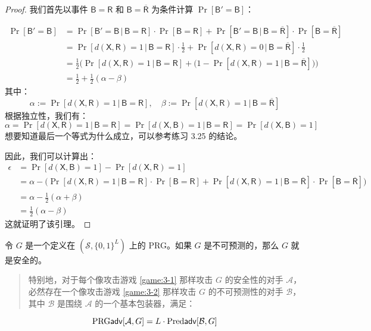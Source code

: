 \begin{proof}
我们首先以事件 $\mathsf{B}=\mathsf{R}$ 和 $\mathsf{B}=\mathsf{\overline R}$ 为条件计算 $\Pr[\mathsf{B}'=\mathsf{B}]$：

$$
\begin{aligned}
\Pr[\mathsf{B}'=\mathsf{B}]
&=\Pr[\mathsf{B}'=\mathsf{B}\,|\,\mathsf{B}=\mathsf{R}]\cdot\Pr[\mathsf{B}=\mathsf{R}]+\Pr[\mathsf{B}'=\mathsf{B}\,|\,\mathsf{B}=\mathsf{\overline R}]\cdot\Pr[\mathsf{B}=\mathsf{\overline R}]\\
&=\Pr[d(\mathsf{X},\mathsf{R})=1\,|\,\mathsf{B}=\mathsf{R}]\cdot\frac{1}{2}+\Pr[d(\mathsf{X},\mathsf{R})=0\,|\,\mathsf{B}=\mathsf{\overline R}]\cdot\frac{1}{2}\\
&=\frac{1}{2}
\Big(\Pr[d(\mathsf{X},\mathsf{R})=1\,|\,\mathsf{B}=\mathsf{R}]+
\big(
1-\Pr[d(\mathsf{X},\mathsf{R})=1\,|\,\mathsf{B}=\mathsf{\overline R}]
\big)
\Big)\\
&=\frac{1}{2}+\frac{1}{2}(\alpha-\beta)
\end{aligned}
$$
其中：
$$
\alpha:=\Pr[d(\mathsf{X},\mathsf{R})=1\,|\,\mathsf{B}=\mathsf{R}],\quad
\beta:=\Pr[d(\mathsf{X},\mathsf{R})=1\,|\,\mathsf{B}=\mathsf{\overline R}]
$$
根据独立性，我们有：
$$
\alpha=\Pr[d(\mathsf{X},\mathsf{R})=1\,|\,\mathsf{B}=\mathsf{R}]=\Pr[d(\mathsf{X},\mathsf{B})=1\,|\,\mathsf{B}=\mathsf{R}]=\Pr[d(\mathsf{X},\mathsf{B})=1]
$$
想要知道最后一个等式为什么成立，可以参考练习 3.25 的结论。

因此，我们可以计算出：
$$
\begin{aligned}
\epsilon
&=\Pr[d(\mathsf{X},\mathsf{B})=1]-\Pr[d(\mathsf{X},\mathsf{R})=1]\\
&=\alpha-
\Big(\Pr[d(\mathsf{X},\mathsf{R})=1\,|\,\mathsf{B}=\mathsf{R}]\cdot\Pr[\mathsf{B}=\mathsf{R}]+\Pr[d(\mathsf{X},\mathsf{R})=1\,|\,\mathsf{B}=\mathsf{\overline R}]\cdot\Pr[\mathsf{B}=\mathsf{\overline R}]
\Big)\\
&=\alpha-\frac{1}{2}(\alpha+\beta)\\
&=\frac{1}{2}(\alpha-\beta)
\end{aligned}
$$
这就证明了该引理。
\end{proof}

\begin{theorem}
令 $G$ 是一个定义在 $(\mathcal{S},\{0,1\}^L)$ 上的 PRG。如果 $G$ 是不可预测的，那么 $G$ 就是安全的。
\begin{quote}
特别地，对于每个像攻击游戏 \ref{game:3-1} 那样攻击 $G$ 的安全性的对手 $\mathcal{A}$，必然存在一个像攻击游戏 \ref{game:3-2} 那样攻击 $G$ 的不可预测性的对手 $\mathcal{B}$，其中 $\mathcal{B}$ 是围绕 $\mathcal{A}$ 的一个基本包装器，满足：
\end{quote}
$$
{\rm PRG\mathsf{adv}}[\mathcal{A},G]=L\cdot{\rm Pred\mathsf{adv}}[\mathcal{B},G]
$$
\end{theorem}

